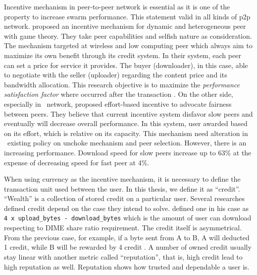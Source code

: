 Incentive mechanism in peer-to-peer network is essential as it is one of the property to increase swarm performance. This statement valid in all kinds of p2p network. \citeauthor{2015:incentivep2pgame:kang} proposed an incentive mechanism for dynamic and heterogeneous peer with game theory. They take peer capabilities and selfish nature as consideration. The mechanism targeted at wireless and low computing peer which always aim to maximize its own benefit through its credit system. In their system, each peer can set a price for service it provides. The buyer (downloader), in this case, able to negotiate with the seller (uploader) regarding the content price and its bandwidth allocation. This research objective is to maximize the \textit{performance satisfaction factor} where occurred after the transaction \cite{2015:incentivep2pgame:kang}. On the other side, especially in \bt~network, \citeauthor{2010:effortincentive:rahman} proposed effort-based incentive to advocate fairness between peers. They believe that current incentive system disfavor slow peers and eventually will decrease overall performance. In this system, user awarded based on its effort, which is relative on its capacity. This mechanism need alteration in \bt~existing policy on unchoke mechanism and peer selection. However, there is an increasing performance. Download speed for slow peers increase up to 63\% at the expense of decreasing speed for fast peer at 4\%.

When using currency as the incentive mechanism, it is necessary to define the transaction unit used between the user. In this thesis, we define it as ``credit''. ``Wealth'' is a collection of stored credit on a particular user. Several researches defined credit depend on the case they intend to solve. \citeauthor{2012:economicbt:kash} defined one in his case as \texttt{4 x upload\_bytes - download\_bytes} which is the amount of user can download respecting to DIME share ratio requirement. The credit itself is asymmetrical. From the previous case, for example, if a byte sent from A to B, A will deducted 1 credit, while B will be rewarded by 4 credit \cite{2012:economicbt:kash}. A number of owned credit usually stay linear with another metric called ``reputation'', that is, high credit lead to high reputation as well. Reputation shows how trusted and dependable a user is. 

